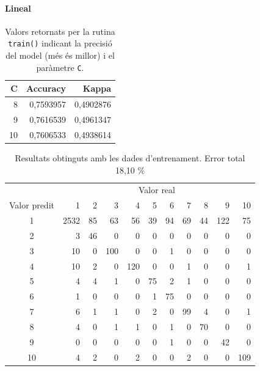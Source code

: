 \documentclass[a4paper]{article}
\begin{document}
\paragraph{Lineal}

\begin{table}[H]
	\centering
	\def\arraystretch{1.2}
	\begin{tabular}{|rrr|}
		\hline
		C & Accuracy & Kappa \\
		\hline
		8 & 0,7593957 & 0,4902876 \\
		\rowcolor{Orange!40}
		9 & 0,7616539 & 0,4961347 \\
		10 & 0,7606533 & 0,4938614 \\
		\hline
	\end{tabular}
	\captionsetup{width=0.6\textwidth}
	\caption{Valors retornats per la rutina \texttt{train()} indicant la precisió del model (més és millor) i el paràmetre \texttt{C}.}
\end{table}

\begin{table}[H]
	\centering
	\def\arraystretch{1.2}
	\begin{tabular}{|c|rrrrrrrrrr|}
		\hline
		& \multicolumn{10}{c|}{Valor real} \\
		Valor predit & 1 & 2 & 3 & 4 & 5 & 6 & 7 & 8 & 9 & 10 \\
		\hline
		1 & 2532 & 85 & 63 & 56 & 39 & 94 & 69 & 44 & 122 & 75 \\
		2 & 3 & 46 & 0 & 0 & 0 & 0 & 0 & 0 & 0 & 0 \\
		3 & 10 & 0 & 100 & 0 & 0 & 1 & 0 & 0 & 0 & 0 \\
		4 & 10 & 2 & 0 & 120 & 0 & 0 & 1 & 0 & 0 & 1 \\
		5 & 4 & 4 & 1 & 0 & 75 & 2 & 1 & 0 & 0 & 0 \\
		6 & 1 & 0 & 0 & 0 & 1 & 75 & 0 & 0 & 0 & 0 \\
		7 & 6 & 1 & 1 & 0 & 2 & 0 & 99 & 4 & 0 & 1 \\
		8 & 4 & 0 & 1 & 1 & 0 & 1 & 0 & 70 & 0 & 0 \\
		9 & 0 & 0 & 0 & 0 & 0 & 1 & 0 & 0 & 42 & 0 \\
		10 & 4 & 2 & 0 & 2 & 0 & 0 & 2 & 0 & 0 & 109 \\
		\hline
	\end{tabular}
	\caption{Resultats obtinguts amb les dades d'entrenament. Error total 18,10 \%}
	\label{tab:svm_lineal_k1}
\end{table}
\end{document}
